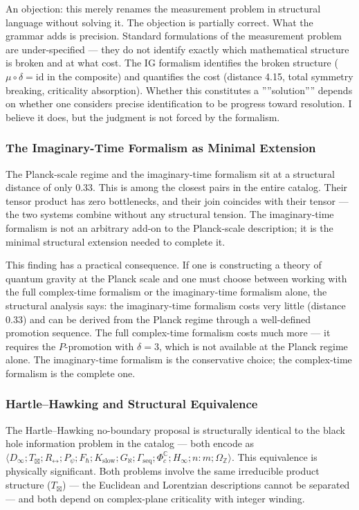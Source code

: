 \documentclass[12pt,a4paper]{article}
\begin{document}
An objection: this merely renames the measurement problem in structural language without solving it. The objection is partially correct. What the grammar adds is precision. Standard formulations of the measurement problem are under-specified --- they do not identify exactly which mathematical structure is broken and at what cost. The IG formalism identifies the broken structure ($\mu \circ \delta = \text{id}$ in the composite) and quantifies the cost (distance 4.15, total symmetry breaking, criticality absorption). Whether this constitutes a ''''solution'''' depends on whether one considers precise identification to be progress toward resolution. I believe it does, but the judgment is not forced by the formalism.

\subsubsection{The Imaginary-Time Formalism as Minimal Extension}

The Planck-scale regime and the imaginary-time formalism sit at a structural distance of only 0.33. This is among the closest pairs in the entire catalog. Their tensor product has zero bottlenecks, and their join coincides with their tensor --- the two systems combine without any structural tension. The imaginary-time formalism is not an arbitrary add-on to the Planck-scale description; it is the minimal structural extension needed to complete it.

This finding has a practical consequence. If one is constructing a theory of quantum gravity at the Planck scale and one must choose between working with the full complex-time formalism or the imaginary-time formalism alone, the structural analysis says: the imaginary-time formalism costs very little (distance 0.33) and can be derived from the Planck regime through a well-defined promotion sequence. The full complex-time formalism costs much more --- it requires the $P$-promotion with $\delta = 3$, which is not available at the Planck regime alone. The imaginary-time formalism is the conservative choice; the complex-time formalism is the complete one.

\subsubsection{Hartle--Hawking and Structural Equivalence}

The Hartle--Hawking no-boundary proposal is structurally identical to the black hole information problem in the catalog --- both encode as $\langle D_{\infty}; T_{\boxtimes}; R_{\leftrightarrow}; P_{\psi}; F_{\hbar}; K_{\text{slow}}; G_{\aleph}; \Gamma_{\text{seq}}; \Phi_c^\mathbb{C}; H_{\infty}; n{:}m; \Omega_\mathbb{Z} \rangle$. This equivalence is physically significant. Both problems involve the same irreducible product structure ($T_{\boxtimes}$) --- the Euclidean and Lorentzian descriptions cannot be separated --- and both depend on complex-plane criticality with integer winding.
\end{document}
